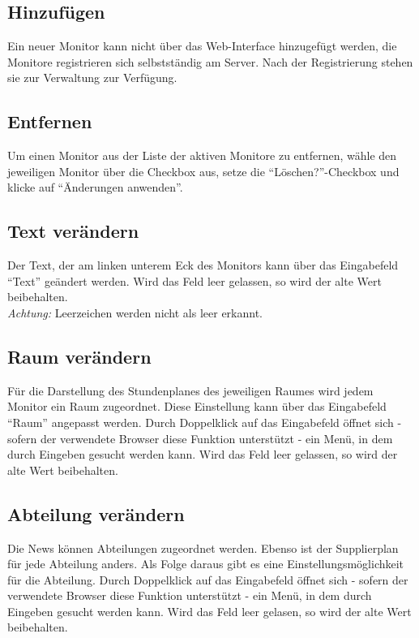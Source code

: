 \subsection{Hinzufügen}

Ein neuer Monitor kann nicht über das Web-Interface hinzugefügt werden, die Monitore registrieren sich selbstständig am Server. Nach der Registrierung stehen sie zur Verwaltung zur Verfügung.

\subsection{Entfernen}

Um einen Monitor aus der Liste der aktiven Monitore zu entfernen, wähle den jeweiligen Monitor über die Checkbox aus, setze die \enquote{Löschen?}-Checkbox und klicke auf \enquote{Änderungen anwenden}.

\subsection{Text verändern}

Der Text, der am linken unterem Eck des Monitors kann über das Eingabefeld \enquote{Text} geändert werden. Wird das Feld leer gelassen, so wird der alte Wert beibehalten.\\
\textit{Achtung:} Leerzeichen werden nicht als leer erkannt.

\subsection{Raum verändern}

Für die Darstellung des Stundenplanes des jeweiligen Raumes wird jedem Monitor ein Raum zugeordnet. Diese Einstellung kann über das Eingabefeld \enquote{Raum} angepasst werden. Durch Doppelklick auf das Eingabefeld öffnet sich - sofern der verwendete Browser diese Funktion unterstützt - ein Menü, in dem durch Eingeben gesucht werden kann. Wird das Feld leer gelassen, so wird der alte Wert beibehalten.

\subsection{Abteilung verändern}

Die News können Abteilungen zugeordnet werden. Ebenso ist der Supplierplan für jede Abteilung anders. Als Folge daraus gibt es eine Einstellungsmöglichkeit für die Abteilung. Durch Doppelklick auf das Eingabefeld öffnet sich - sofern der verwendete Browser diese Funktion unterstützt - ein Menü, in dem durch Eingeben gesucht werden kann. Wird das Feld leer gelasen, so wird der alte Wert beibehalten.

